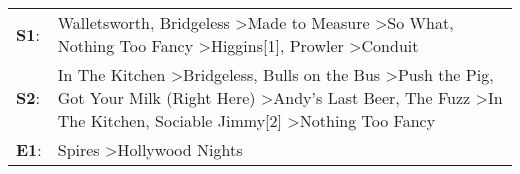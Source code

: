 \begin{supertabular}{p{0.03\textwidth}p{0.92\textwidth}}
 \textbf{S1}:  &                                                                                                                                         Walletsworth\textsuperscript{}, \enspace Bridgeless\textsuperscript{} \textgreater \enspace Made to Measure\textsuperscript{} \textgreater \enspace So What\textsuperscript{}, \enspace Nothing Too Fancy\textsuperscript{} \textgreater \enspace Higgins[1]\textsuperscript{}, \enspace Prowler\textsuperscript{} \textgreater \enspace Conduit\textsuperscript{}  \enspace  \\
 \textbf{S2}:  &  In The Kitchen\textsuperscript{} \textgreater \enspace Bridgeless\textsuperscript{}, \enspace Bulls on the Bus\textsuperscript{} \textgreater \enspace Push the Pig\textsuperscript{}, \enspace Got Your Milk (Right Here)\textsuperscript{} \textgreater \enspace Andy's Last Beer\textsuperscript{}, \enspace The Fuzz\textsuperscript{} \textgreater \enspace In The Kitchen\textsuperscript{}, \enspace Sociable Jimmy[2]\textsuperscript{} \textgreater \enspace Nothing Too Fancy\textsuperscript{}  \enspace  \\
 \textbf{E1}:  &                                                                                                                                                                                                                                                                                                                                                                                                                          Spires\textsuperscript{} \textgreater \enspace Hollywood Nights\textsuperscript{}  \enspace  \\
\end{supertabular}

